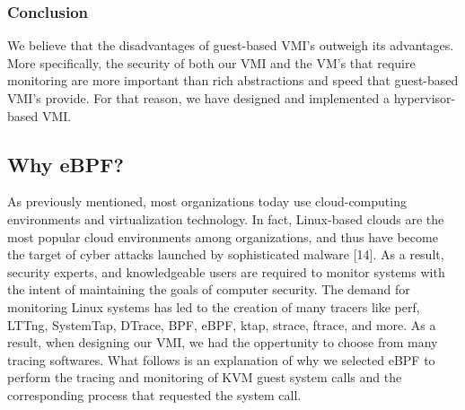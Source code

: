 \documentclass{report}
\begin{document}
\begin{spacing}{1.5}
\subsubsection{Conclusion}

{\large
We believe that the disadvantages of guest-based VMI's outweigh its advantages. More specifically, the security of both our VMI and the VM's that require monitoring are more important than rich abstractions and speed that guest-based VMI's provide. For that reason, we have designed and implemented a hypervisor-based VMI.
\newline
}
















\subsection{Why eBPF?}

{\large
As previously mentioned, most organizations today use cloud-computing environments and virtualization technology. In fact, Linux-based clouds are the most popular cloud environments among organizations, and thus have become the target of cyber attacks launched by sophisticated malware [14]. As a result, security experts, and knowledgeable users are required to monitor systems with the intent of maintaining the goals of computer security. The demand for monitoring Linux systems has led to the creation of many tracers like perf, LTTng, SystemTap, DTrace, BPF, eBPF, ktap, strace, ftrace, and more. As a result, when designing our VMI, we had the oppertunity to choose from many tracing softwares. What follows is an explanation of why we selected eBPF to perform the tracing and monitoring of KVM guest system calls and the corresponding process that requested the system call.
\newline
}


\end{spacing}
\end{document}
